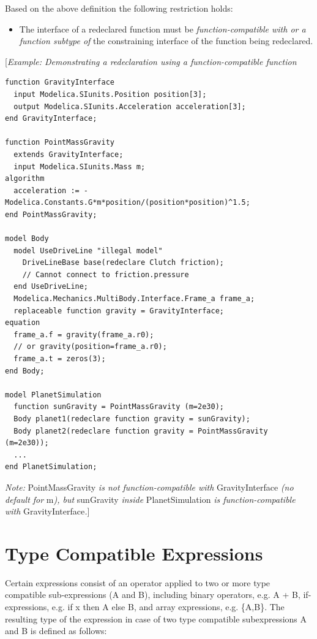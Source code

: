 \documentclass[10pt,a4paper]{report}
\def\doublelabel#1{\label{#1}}
\begin{document}
Based on the above definition the following restriction holds:

\begin{itemize}
\item
  The interface of a redeclared function must be
  \emph{function-compatible with or a function subtype of} the
  constraining interface of the function being redeclared.
\end{itemize}

{[}\emph{Example: Demonstrating a redeclaration using a
function-compatible function}
\begin{lstlisting}[language=modelica]
function GravityInterface
  input Modelica.SIunits.Position position[3];
  output Modelica.SIunits.Acceleration acceleration[3];
end GravityInterface;

function PointMassGravity
  extends GravityInterface;
  input Modelica.SIunits.Mass m;
algorithm 
  acceleration := -Modelica.Constants.G*m*position/(position*position)^1.5;
end PointMassGravity;

model Body
  model UseDriveLine "illegal model"
    DriveLineBase base(redeclare Clutch friction);
    // Cannot connect to friction.pressure
  end UseDriveLine;
  Modelica.Mechanics.MultiBody.Interface.Frame_a frame_a;
  replaceable function gravity = GravityInterface;
equation 
  frame_a.f = gravity(frame_a.r0);
  // or gravity(position=frame_a.r0);
  frame_a.t = zeros(3);
end Body;

model PlanetSimulation
  function sunGravity = PointMassGravity (m=2e30);
  Body planet1(redeclare function gravity = sunGravity);
  Body planet2(redeclare function gravity = PointMassGravity (m=2e30));
  ...
end PlanetSimulation;
\end{lstlisting}

\emph{Note:} PointMassGravity \emph{is not function-compatible with}
GravityInterface \emph{(no default for} m\emph{), but} sunGravity
\emph{inside} PlanetSimulation \emph{is function-compatible with}
GravityInterface\emph{.}{]}

\section{Type Compatible Expressions}\doublelabel{type-compatible-expressions}

Certain expressions consist of an operator applied to two or more type
compatible sub-expressions (A and B), including binary operators, e.g. A
+ B, if-expressions, e.g. if x then A else B, and array expressions,
e.g. \{A,B\}. The resulting type of the expression in case of two type
compatible subexpressions A and B is defined as follows:
\end{document}
